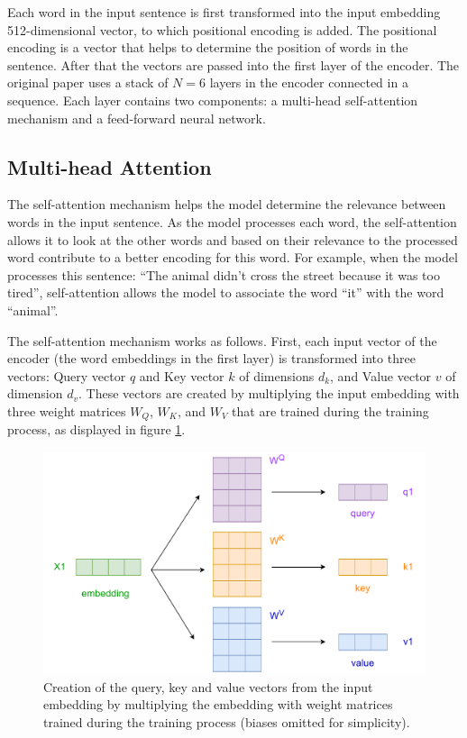 Each word in the input sentence is first transformed into the input embedding 512-dimensional vector, to which positional encoding is added. The positional encoding is a vector that helps to determine the position of words in the sentence. After that the vectors are passed into the first layer of the encoder. The original paper uses a stack of $N=6$ layers in the encoder connected in a sequence. Each layer contains two components: a multi-head self-attention mechanism and a feed-forward neural network.

\subsection*{Multi-head Attention}
The self-attention mechanism helps the model determine the relevance between words in the input sentence. As the model processes each word, the self-attention allows it to look at the other words and based on their relevance to the processed word contribute to a better encoding for this word. For example, when the model processes this sentence: “The animal didn't cross the street because it was too tired”, self-attention allows the model to associate the word “it” with the word “animal”.

The self-attention mechanism works as follows. First, each input vector of the encoder (the word embeddings in the first layer) is transformed into three vectors: Query vector $q$ and Key vector $k$ of dimensions $d_k$, and Value vector $v$ of dimension $d_v$. These vectors are created by multiplying the input embedding with three weight matrices $W_Q$, $W_K$, and $W_V$ that are trained during the training process, as displayed in figure \ref{fig:attention1}.

\begin{figure}[H]
    \centering
    \includegraphics[scale=0.6]{obrazky-figures/attention1.pdf}
    \caption{Creation of the query, key and value vectors from the input embedding by multiplying the embedding with weight matrices trained during the training process (biases omitted for simplicity).}
    \label{fig:attention1}
\end{figure}


